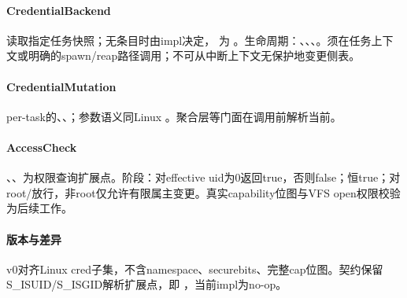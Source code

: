 \paragraph{CredentialBackend}

读取指定任务快照；无条目时由impl决定， 为 。生命周期：、、、。须在任务上下文或明确的spawn/reap路径调用；不可从中断上下文无保护地变更侧表。

\paragraph{CredentialMutation}

per-task的、、；参数语义同Linux 。聚合层等门面在调用前解析当前。

\paragraph{AccessCheck}

、、为权限查询扩展点。阶段：对effective uid为0返回true，否则false；恒true；对root/放行，非root仅允许有限属主变更。真实capability位图与VFS open权限校验为后续工作。

\paragraph{版本与差异}

v0对齐Linux cred子集，不含namespace、securebits、完整cap位图。契约保留S\_ISUID/S\_ISGID解析扩展点，即 ，当前impl为no-op。
